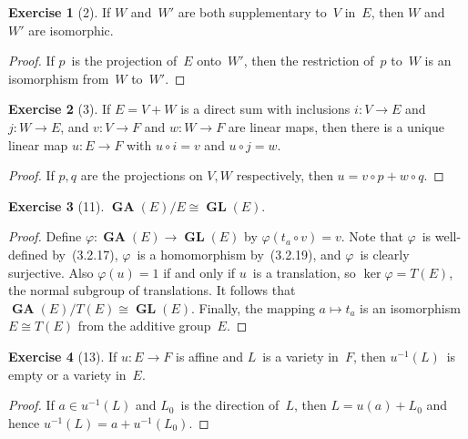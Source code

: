 \documentclass[letterpaper,12pt]{article}
\newcommand{\iso}{\cong}
\newcommand{\after}{\circ}
\DeclareMathOperator{\GL}{\mathbf{GL}}
\DeclareMathOperator{\GA}{\mathbf{GA}}
\newcommand{\inv}[1]{#1^{-1}}
\theoremstyle{definition}
\newtheorem*{exer}{Exercise}
\theoremstyle{remark}
\begin{document}
\begin{exer}[2]
If \(W\) and~\(W'\) are both supplementary to~\(V\) in~\(E\), then \(W\) and~\(W'\) are isomorphic.
\end{exer}
\begin{proof}
If \(p\)~is the projection of~\(E\) onto~\(W'\), then the restriction of~\(p\) to~\(W\) is an isomorphism from~\(W\) to~\(W'\).
\end{proof}

\begin{exer}[3]
If \(E=V+W\) is a direct sum with inclusions \(i:V\to E\) and \(j:W\to E\), and \(v:V\to F\) and \(w:W\to F\) are linear maps, then there is a unique linear map \(u:E\to F\) with \(u\after i=v\) and \(u\after j=w\).
\end{exer}
\begin{proof}
If \(p,q\) are the projections on \(V,W\) respectively, then \(u=v\after p+w\after q\).
\end{proof}

\begin{exer}[11]
\(\GA(E)/E\iso\GL(E)\).
\end{exer}
\begin{proof}
Define \(\varphi:\GA(E)\to\GL(E)\) by \(\varphi(t_a\after v)=v\). Note that \(\varphi\)~is well-defined by~(3.2.17), \(\varphi\)~is a homomorphism by~(3.2.19), and \(\varphi\)~is clearly surjective. Also \(\varphi(u)=1\) if and only if \(u\)~is a translation, so \(\ker\varphi=T(E)\), the normal subgroup of translations. It follows that \(\GA(E)/T(E)\iso\GL(E)\). Finally, the mapping \(a\mapsto t_a\) is an isomorphism \(E\iso T(E)\) from the additive group~\(E\).
\end{proof}

\begin{exer}[13]
If \(u:E\to F\) is affine and \(L\)~is a variety in~\(F\), then \(\inv{u}(L)\)~is empty or a variety in~\(E\).
\end{exer}
\begin{proof}
If \(a\in\inv{u}(L)\) and \(L_0\)~is the direction of~\(L\), then \(L=u(a)+L_0\) and hence \(\inv{u}(L)=a+\inv{u}(L_0)\).
\end{proof}
\end{document}

